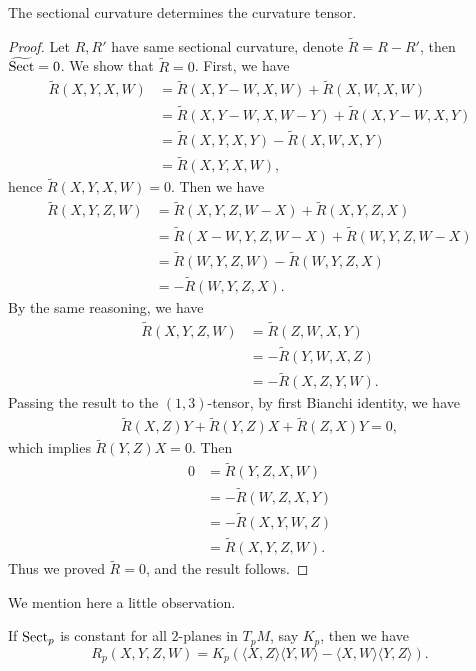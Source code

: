 \begin{prop}\label{sect to curvature}
    The sectional curvature determines the curvature tensor.
\end{prop}
\begin{proof}
    Let $R,R'$ have same sectional curvature, denote $\tilde{R}=R-R'$, then $\widetilde{\operatorname{Sect}}=0$.
    We show that $\tilde{R}=0$.
    First, we have
    \begin{align*}
        \tilde{R}(X,Y,X,W)&=\tilde{R}(X,Y-W,X,W)+\tilde{R}(X,W,X,W)\\
        &=\tilde{R}(X,Y-W,X,W-Y)+\tilde{R}(X,Y-W,X,Y)\\
        &=\tilde{R}(X,Y,X,Y)-\tilde{R}(X,W,X,Y)\\
        &=\tilde{R}(X,Y,X,W),
    \end{align*}
    hence $\tilde{R}(X,Y,X,W)=0$.
    Then we have
    \begin{align*}
        \tilde{R}(X,Y,Z,W)&=\tilde{R}(X,Y,Z,W-X)+\tilde{R}(X,Y,Z,X)\\
        &=\tilde{R}(X-W,Y,Z,W-X)+\tilde{R}(W,Y,Z,W-X)\\
        &=\tilde{R}(W,Y,Z,W)-\tilde{R}(W,Y,Z,X)\\
        &=-\tilde{R}(W,Y,Z,X).
    \end{align*}
    By the same reasoning, we have
    \begin{align*}
        \tilde{R}(X,Y,Z,W)&=\tilde{R}(Z,W,X,Y)\\
        &=-\tilde{R}(Y,W,X,Z)\\
        &=-\tilde{R}(X,Z,Y,W).
    \end{align*}
    Passing the result to the $(1,3)$-tensor, by first Bianchi identity, we have
    \begin{align*}
        \tilde{R}(X,Z)Y+\tilde{R}(Y,Z)X+\tilde{R}(Z,X)Y=0,
    \end{align*}
    which implies $\tilde{R}(Y,Z)X=0$.
    Then
    \begin{align*}
        0&=\tilde{R}(Y,Z,X,W)\\
        &=-\tilde{R}(W,Z,X,Y)\\
        &=-\tilde{R}(X,Y,W,Z)\\
        &=\tilde{R}(X,Y,Z,W).
    \end{align*}
    Thus we proved $\tilde{R}=0$, and the result follows.
\end{proof}

We mention here a little observation.
\begin{lem}\label{curvature of const sect}
    If $\operatorname{Sect}_p$ is constant for all $2$-planes in $T_pM$, say $K_p$, then we have
    \[R_p(X,Y,Z,W)=K_p(\langle X,Z\rangle\langle Y,W\rangle-\langle X,W\rangle\langle Y,Z\rangle).\]
\end{lem}

